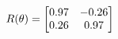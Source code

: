 \documentclass[preview]{standalone}
\begin{document}
\begin{align*}
\special{dvisvgm:raw <g id='unique000'>}R(\theta) = \begin{bmatrix}0.97 & -0.26\\0.26 & 0.97\end{bmatrix}\special{dvisvgm:raw </g>}
\end{align*}
\end{document}
